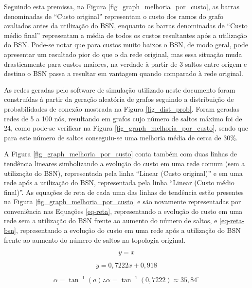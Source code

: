 Seguindo esta premissa, na Figura \ref{fig_graph_melhoria_por_custo}, as barras denominadas de ``Custo original'' representam o custo dos ramos do grafo avaliados antes da utilização do BSN, enquanto as barras denominadas de ``Custo médio final'' representam a média de todos os custos resultantes após a utilização do BSN. Pode-se notar que para custos muito baixos o BSN, de modo geral, pode apresentar um resultado pior do que o da rede original, mas essa situação muda drasticamente para custos maiores, na verdade à partir de 3 saltos entre origem e destino o BSN passa a resultar em vantagem quando comparado à rede original.

As redes geradas pelo software de simulação utilizado neste documento foram construídas à partir da geração aleatória de grafos seguindo a distribuição de probabilidades de conexão mostrada na Figura \ref{fig_dist_prob}. Foram geradas redes de 5 a 100 nós, resultando em grafos cujo número de saltos máximo foi de 24, como pode-se verificar na Figura \ref{fig_graph_melhoria_por_custo}, sendo que para este número de saltos conseguiu-se uma melhoria média de cerca de 30\%.

A Figura \ref{fig_graph_melhoria_por_custo} conta também com duas linhas de tendência lineares simbolizando a evolução do custo em uma rede comum (sem a utilização do BSN), representada pela linha ``Linear (Custo original)'' e em uma rede após a utilização do BSN, representada pela linha ``Linear (Custo médio final)''. As equações de reta de cada uma das linhas de tendência estão presentes na Figura \ref{fig_graph_melhoria_por_custo} e são novamente representadas por conveniência nas Equações \ref{eq-reta}, representando a evolução do custo em uma rede sem a utilização do BSN frente ao aumento do número de saltos, e \ref{eq-reta-bsn}, representando a evolução do custo em uma rede após a utilização do BSN frente ao aumento do número de saltos na topologia original.

\begin{equation}
y = x
\label{eq-reta}
\end{equation}

\begin{equation}
y = 0,7222x + 0,918
\label{eq-reta-bsn}
\end{equation}

\begin{equation}
\alpha = \tan ^{-1}(a)\therefore \alpha =\tan ^{-1}(0,7222)\approx 35,84^{\circ}
\label{eq-coeficiente-angular}
\end{equation}

